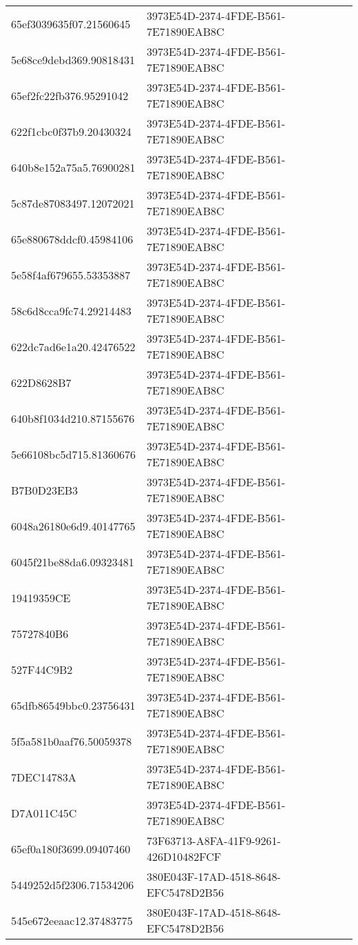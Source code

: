 \begin{tabular}{ll}
65ef3039635f07.21560645 & 3973E54D-2374-4FDE-B561-7E71890EAB8C \\
5e68ce9debd369.90818431 & 3973E54D-2374-4FDE-B561-7E71890EAB8C \\
65ef2fc22fb376.95291042 & 3973E54D-2374-4FDE-B561-7E71890EAB8C \\
622f1cbc0f37b9.20430324 & 3973E54D-2374-4FDE-B561-7E71890EAB8C \\
640b8e152a75a5.76900281 & 3973E54D-2374-4FDE-B561-7E71890EAB8C \\
5c87de87083497.12072021 & 3973E54D-2374-4FDE-B561-7E71890EAB8C \\
65e880678ddcf0.45984106 & 3973E54D-2374-4FDE-B561-7E71890EAB8C \\
5e58f4af679655.53353887 & 3973E54D-2374-4FDE-B561-7E71890EAB8C \\
58c6d8cca9fc74.29214483 & 3973E54D-2374-4FDE-B561-7E71890EAB8C \\
622dc7ad6e1a20.42476522 & 3973E54D-2374-4FDE-B561-7E71890EAB8C \\
622D8628B7 & 3973E54D-2374-4FDE-B561-7E71890EAB8C \\
640b8f1034d210.87155676 & 3973E54D-2374-4FDE-B561-7E71890EAB8C \\
5e66108bc5d715.81360676 & 3973E54D-2374-4FDE-B561-7E71890EAB8C \\
B7B0D23EB3 & 3973E54D-2374-4FDE-B561-7E71890EAB8C \\
6048a26180e6d9.40147765 & 3973E54D-2374-4FDE-B561-7E71890EAB8C \\
6045f21be88da6.09323481 & 3973E54D-2374-4FDE-B561-7E71890EAB8C \\
19419359CE & 3973E54D-2374-4FDE-B561-7E71890EAB8C \\
75727840B6 & 3973E54D-2374-4FDE-B561-7E71890EAB8C \\
527F44C9B2 & 3973E54D-2374-4FDE-B561-7E71890EAB8C \\
65dfb86549bbc0.23756431 & 3973E54D-2374-4FDE-B561-7E71890EAB8C \\
5f5a581b0aaf76.50059378 & 3973E54D-2374-4FDE-B561-7E71890EAB8C \\
7DEC14783A & 3973E54D-2374-4FDE-B561-7E71890EAB8C \\
D7A011C45C & 3973E54D-2374-4FDE-B561-7E71890EAB8C \\
65ef0a180f3699.09407460 & 73F63713-A8FA-41F9-9261-426D10482FCF \\
5449252d5f2306.71534206 & 380E043F-17AD-4518-8648-EFC5478D2B56 \\
545e672eeaac12.37483775 & 380E043F-17AD-4518-8648-EFC5478D2B56 \\

\end{tabular}
